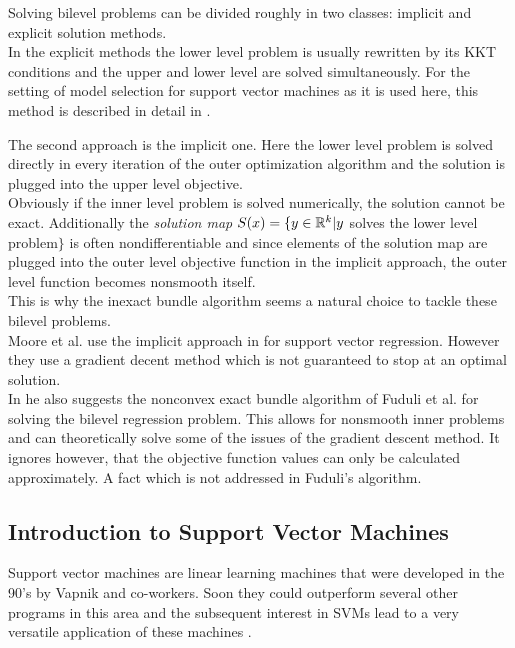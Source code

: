 Solving bilevel problems can be divided roughly in two classes: implicit and explicit solution methods. \\
In the explicit methods the lower level problem is usually rewritten by its KKT conditions and the upper and lower level are solved simultaneously. For the setting of model selection for support vector machines as it is used here, this method is described in detail in \cite{Kunapuli2008}.

The second approach is the implicit one. Here the lower level problem is solved directly in every iteration of the outer optimization algorithm and the solution is plugged into the upper level objective. \\
Obviously if the inner level problem is solved numerically, the solution cannot be exact. Additionally the \emph{solution map} \( S(x) = \{y \in \mathbb{R}^k | y\) solves the lower level problem\(\}\) is often nondifferentiable \cite{Outrata1998} and since elements of  the solution map are plugged into the outer level objective function in the implicit approach, the outer level function becomes nonsmooth itself. \\
This is why the inexact bundle algorithm seems a natural choice to tackle these bilevel problems. \\ 
Moore et al. use the implicit approach in \cite{Moore2011} for support vector regression. However they use a gradient decent method which is not guaranteed to stop at an optimal solution. \\
In \cite{Moore2010a} he also suggests the nonconvex exact bundle algorithm of Fuduli et al. \cite{Fuduli2004a} for solving the bilevel regression problem. This allows for nonsmooth inner problems and can theoretically solve some of the issues of the gradient descent method. It ignores however, that the objective function values can only be calculated approximately. A fact which is not addressed in Fuduli's algorithm.



\subsection{Introduction to Support Vector Machines}
Support vector machines are linear learning machines that were developed in the 90's by Vapnik and co-workers. Soon they could outperform several other programs in this area \cite{Cristianini2000} and the subsequent interest in SVMs lead to a very versatile application of these machines \cite{Kunapuli2008}.

